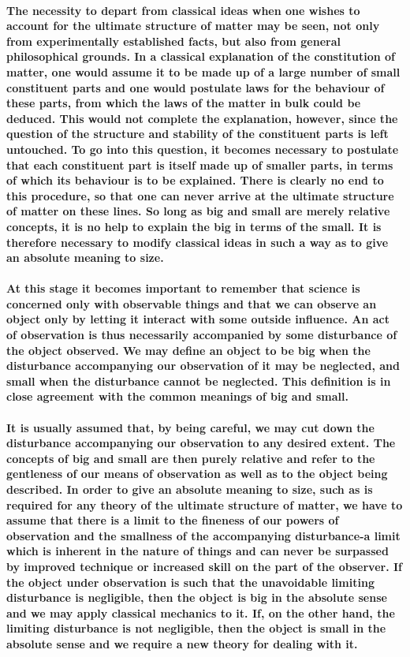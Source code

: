 \documentclass[10pt, kindle, oneside]{kindle}
\begin{document}
\paragraph{The necessity to depart from classical ideas when one wishes to account for the ultimate structure of matter may be seen, not only from experimentally established facts, but also from general philosophical grounds. In a classical explanation of the constitution of matter, one would assume it to be made up of a large number of small constituent parts and one would postulate laws for the behaviour of these parts, from which the laws of the matter in bulk could be deduced. This would not complete the explanation, however, since the question of the structure and stability of the constituent parts is left untouched. To go into this question, it becomes necessary to postulate that each constituent part is itself made up of smaller parts, in terms of which its behaviour is to be explained. There is clearly no end to this procedure, so that one can never arrive at the ultimate structure of matter on these lines. So long as big and small are merely relative concepts, it is no help to explain the big in terms of the small. It is therefore necessary to modify classical ideas in such a way as to give an absolute meaning to size.}
\paragraph{At this stage it becomes important to remember that science is concerned only with observable things and that we can observe an object only by letting it interact with some outside influence. An act of observation is thus necessarily accompanied by some disturbance of the object observed. We may define an object to be big when the disturbance accompanying our observation of it may be neglected, and small when the disturbance cannot be neglected. This definition is in close agreement with the common meanings of big and small.}
\paragraph{It is usually assumed that, by being careful, we may cut down the disturbance accompanying our observation to any desired extent. The concepts of big and small are then purely relative and refer to the gentleness of our means of observation as well as to the object being described. In order to give an absolute meaning to size, such as is required for any theory of the ultimate structure of matter, we have to assume that there is a limit to the fineness of our powers of observation and the smallness of the accompanying disturbance-a limit which is inherent in the nature of things and can never be surpassed by improved technique or increased skill on the part of the observer. If the object under observation is such that the unavoidable limiting disturbance is negligible, then the object is big in the absolute sense and we may apply classical mechanics to it. If, on the other hand, the limiting disturbance is not negligible, then the object is small in the absolute sense and we require a new theory for dealing with it.}
\end{document}
